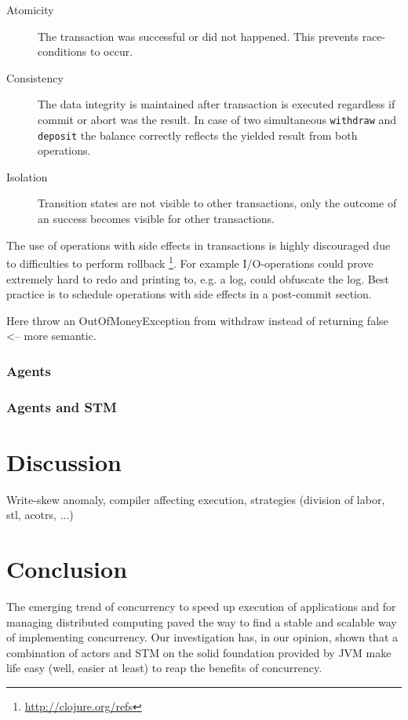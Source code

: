 \documentclass[a4paper,12pt]{kth-mag}
\begin{document}
\begin{description}
    \item[Atomicity] The transaction was successful or did not happened. This prevents race-conditions to occur.
    \item[Consistency] The data integrity is maintained after transaction is executed regardless if commit or abort was the result. In case of two simultaneous \texttt{withdraw} and \texttt{deposit} the balance correctly reflects the yielded result from both operations.
    \item[Isolation] Transition states are not visible to other transactions, only the outcome of an success becomes visible for other transactions.
\end{description}

The use of operations with side effects in transactions is highly discouraged due to difficulties to perform rollback \footnote{\url{http://clojure.org/refs}}. For example I/O-operations could prove extremely hard to redo and printing to, e.g. a log, could obfuscate the log. Best practice is to schedule operations with side effects in a post-commit section.

Here throw an OutOfMoneyException from withdraw instead of returning false <-- more semantic.

\section{Agents}
\section{Agents and STM}

\part{Discussion}
Write-skew anomaly, compiler affecting execution, strategies (division of labor, stl, acotrs, ...)

\part{Conclusion}
The emerging trend of concurrency to speed up execution of applications and for managing distributed computing paved the way to find a stable and scalable way of implementing concurrency. Our investigation has, in our opinion, shown that a combination of actors and STM on the solid foundation provided by JVM make life easy (well, easier at least) to reap the benefits of concurrency.
\end{document}
